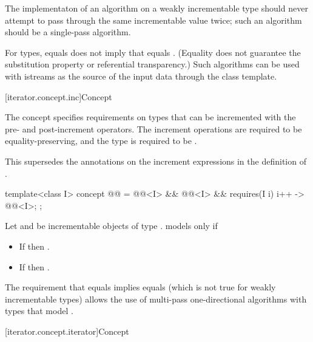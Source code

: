 \pnum
\recommended
The implementaton of an algorithm on a weakly incrementable type
should never attempt to pass through the same incrementable value twice;
such an algorithm should be a single-pass algorithm.
\begin{note}
For  types,  equals  does not imply that 
equals . (Equality does not guarantee the substitution property or referential
transparency.)
Such algorithms
can be used with istreams as the source of the input data through the  class
template.
\end{note}

[iterator.concept.inc]{Concept }

\pnum
The  concept specifies requirements on types that can be incremented with the pre-
and post-increment operators. The increment operations are required to be equality-preserving,
and the type is required to be .
\begin{note}
This supersedes the annotations on the increment expressions
in the definition of .
\end{note}

\begin{codeblock}
template<class I>
  concept @@ =
    @@<I> &&
    @@<I> &&
    requires(I i) {
      { i++ } -> @@<I>;
    };
\end{codeblock}

\pnum
Let  and  be incrementable objects of type .
 models  only if
\begin{itemize}
\item If  then .
\item If  then .
\end{itemize}

\pnum
\begin{note}
The requirement that
 equals 
implies
 equals 
(which is not true for weakly incrementable types)
allows the use of multi-pass one-directional
algorithms with types that model .
\end{note}

[iterator.concept.iterator]{Concept }

